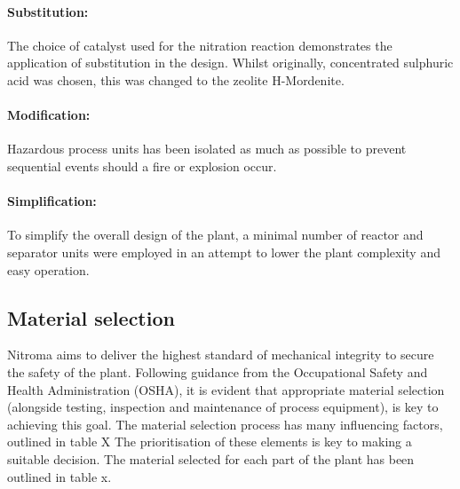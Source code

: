 \paragraph{Substitution:} The choice of catalyst used for the nitration reaction demonstrates the application of substitution in the design. Whilst originally, concentrated sulphuric acid was chosen, this was changed to the zeolite H-Mordenite. 

\paragraph{Modification:} Hazardous process units has been isolated as much as possible to prevent sequential events should a fire or explosion occur. 

\paragraph{Simplification:} To simplify the overall design of the plant, a minimal number of reactor and separator units were employed in an attempt to lower the plant complexity and easy operation.  


\subsection{Material selection}

Nitroma aims to deliver the highest standard of mechanical integrity to secure the safety of the plant.  Following guidance from the Occupational Safety and Health Administration (OSHA), it is evident that appropriate material selection (alongside testing, inspection and maintenance of process equipment), is key to achieving this goal. The material selection process has many influencing factors, outlined in table X
The prioritisation of these elements is key to making a suitable decision. The material selected for each part of the plant has been outlined in table x.

